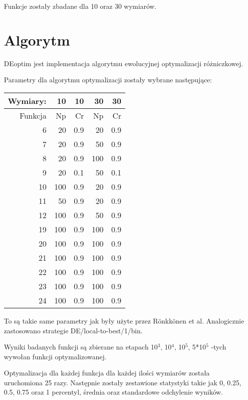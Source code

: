 \documentclass[11pt]{article}
\begin{document}
Funkcje zostały zbadane dla 10 oraz 30 wymiarów.
\section{Algorytm}
\label{sec-2}


DEoptim jest implementacja algorytmu ewolucyjnej optymalizacji różniczkowej.

Parametry dla algorytmu optymalizacji zostały wybrane następujące:


\begin{center}
\begin{tabular}{rrrrr}
 Wymiary:  &   10  &   10  &   30  &   30  \\
\hline
  Funkcja  &   Np  &   Cr  &   Np  &   Cr  \\
\hline
        6  &   20  &  0.9  &   20  &  0.9  \\
        7  &   20  &  0.9  &   50  &  0.9  \\
        8  &   20  &  0.9  &  100  &  0.9  \\
        9  &   20  &  0.1  &   50  &  0.1  \\
       10  &  100  &  0.9  &   20  &  0.9  \\
       11  &   50  &  0.9  &   20  &  0.9  \\
       12  &  100  &  0.9  &   50  &  0.9  \\
       19  &  100  &  0.9  &  100  &  0.9  \\
       20  &  100  &  0.9  &  100  &  0.9  \\
       21  &  100  &  0.9  &  100  &  0.9  \\
       22  &  100  &  0.9  &  100  &  0.9  \\
       23  &  100  &  0.9  &  100  &  0.9  \\
       24  &  100  &  0.9  &  100  &  0.9  \\
\end{tabular}
\end{center}



To są takie same parametry jak były użyte przez Rönkkönen et
al. Analogicznie zastosowano strategie DE/local-to-best/1/bin.

Wyniki badanych funkcji są zbierane na etapach 10$^3$, 10$^4$, 10$^5$,
5*10$^5$ -tych wywołan funkcji optymalizowanej.

Optymalizacja dla każdej funkcja dla każdej ilości wymiarów została
uruchomiona 25 razy. Następnie zostały zestawione statystyki takie jak
0, 0.25, 0.5, 0.75 oraz 1 percentyl, średnia oraz standardowe
odchylenie wyników.
\end{document}
